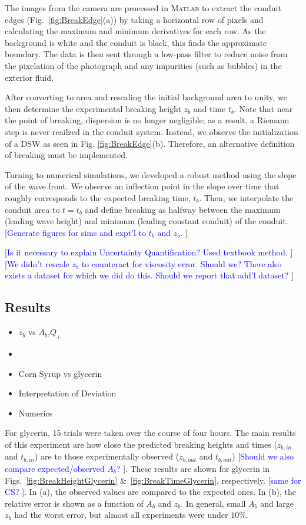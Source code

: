 \documentclass{jfm}
\newcommand{\MM}[1]{[\textcolor{blue}{#1 }]}
\begin{document}
	
    The images from the camera are processed in \textsc{Matlab} to extract the conduit edges (Fig.~\ref{fig:BreakEdge}(a)) by taking a horizontal row of pixels and calculating the maximum and minimum derivatives for each row. 
    As the background is white and the conduit is black, this finds the approximate boundary. 
    The data is then sent through a low-pass filter to reduce noise from the pixelation of the photograph and any impurities (such as bubbles) in the exterior fluid. 

    
	After converting to area and rescaling the initial background area to unity, we then determine the experimental breaking height $z_b$ and time $t_b$. Note that near the point of breaking, dispersion is no longer negligible; as a result, a Riemann step is never reailzed in the conduit system. Instead, we observe the initialization of a DSW as seen in Fig. \ref{fig:BreakEdge}(b). Therefore, an alternative definition of breaking must be implemented. 
	
	Turning to numerical simulations, we developed a robust method using the slope of the wave front. We observe an inflection point in the slope over time that roughly corresponds to the expected breaking time, $t_b$. 
	Then, we interpolate the conduit area to $t=t_b$ and define breaking as halfway between the maximum (leading wave height) and minimum (leading constant conduit) of the conduit.
	\MM{Generate figures for sims and expt'l to $t_b$ and $z_b$.}
	

    \MM{Is it necessary to explain Uncertainty Quantification? Used textbook method.}
    \MM{We didn't rescale $z_b$ to counteract for viscosity error. Should we? There also exists a dataset for which we did do this. Should we report that add'l dataset?}

\subsection{Results}
	\begin{itemize}
	    \item $z_b$ vs $A_b$,$Q_+$
	    \item \MM{$t_b$ vs the same}
	    \item Corn Syrup vs glycerin
	    \item Interpretation of Deviation 
	    \item Numerics
	\end{itemize}
	For glycerin, 15 trials were taken over the course of four hours. The main results of this experiment are how close the predicted breaking heights and times  ($z_{b,in}$ and $t_{b,in}$) are to those experimentally observed ($z_{b,out}$ and $t_{b,out}$) \MM{Should we also compare expected/observed $A_b$?}. These results are shown for glycerin in Figs.~\ref{fig:BreakHeightGlycerin} \&~\ref{fig:BreakTimeGlycerin}, respectively. \MM{same for CS?}. In (a), the observed values are compared to the expected ones. In (b), the relative error is shown as a function of $A_b$ and $z_b$. In general, small $A_b$ and large $z_b$ had the worst error, but almost all experiments were under $10\%$.
	
\end{document}
